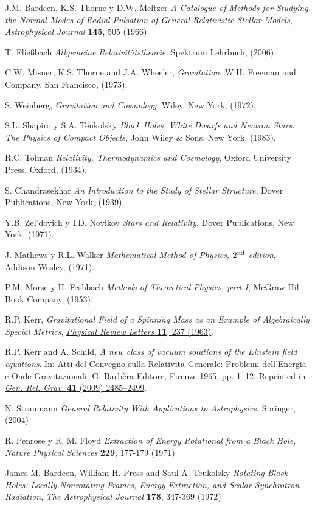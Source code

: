 \begin{thebibliography}{99}
 J.M. Bardeen, K.S. Thorne y D.W. Meltzer {\em A Catalogue of Methods for Studying the Normal Modes of Radial Pulsation of General-Relativistic Stellar Models}, {\sl Astrophysical Journal} {\bf 145}, 505 (1966).

 T. Flie\ss bach {\em Allgemeine Relativit\"atstheorie}, Spektrum Lehrbuch, (2006).

 C.W. Misner, K.S. Thorne and J.A. Wheeler, {\em Gravitation},
W.H. Freeman and Company, San Francisco, (1973).

 S. Weinberg, {\em Gravitation and Cosmology}, Wiley, New
York, (1972).

 S.L. Shapiro y S.A. Teukolsky {\em Black Holes, White Dwarfs and Neutron Stars: The Physics of Compact Objects}, John Wiley \& Sons, New York, (1983).

 R.C. Tolman {\em Relativity, Thermodynamics and Cosmology}, Oxford University Press, Oxford, (1934).

 S. Chandrasekhar {\em An Introduction to the Study of Stellar Structure}, Dover Publications, New York, (1939).


 Y.B. Zel'dovich y I.D. Novikov {\em Stars and Relativity}, Dover Publications, New York, (1971).

 J. Mathews y R.L. Walker {\em Mathematical Method of Physics, $2^{\rm nd}$ edition}, Addison-Wesley, (1971).

 P.M. Morse y H. Feshbach {\em Methods of Theoretical Physics, part I}, McGraw-Hil Book Company,  (1953).

 R.P. Kerr, {\em Gravitational Field of a Spinning Mass as an Example of Algebraically Special Metrics}, \href{https://doi.org/10.1103/PhysRevLett.11.237}{{\sl Physical Review Letters } {\bf 11}, 237 (1963)}.

 R.P. Kerr and A. Schild, {\em A new class of vacuum solutions of the Einstein field equations}. In: Atti del Convegno sulla Relativita Generale: Problemi dell’Energia e Onde Gravitazionali. G. Barbèra Editore, Firenze 1965, pp. 1–12. Reprinted in \href{http://dx.doi.org/10.1007/s10714-009-0856-0}{{\sl Gen. Rel. Grav.} {\bf 41} (2009) 2485--2499}. 

 N. Straumann {\em General Relativity With Applications to Astrophysics}, Springer, (2004)

 R. Penrose y R. M. Floyd {\em Extraction of Energy Rotational from a Black Hole}, {\sl Nature Physical Sciences} {\bf 229}, 177-179 (1971)

 James M. Bardeen, William H. Press and Saul A. Teukolsky {\em Rotating Black Holes: Locally Nonrotating Frames, Energy Extraction, and Scalar Synchrotron Radiation}, {\sl The Astrophysical Journal} {\bf 178}, 347-369 (1972)
\end{thebibliography}
